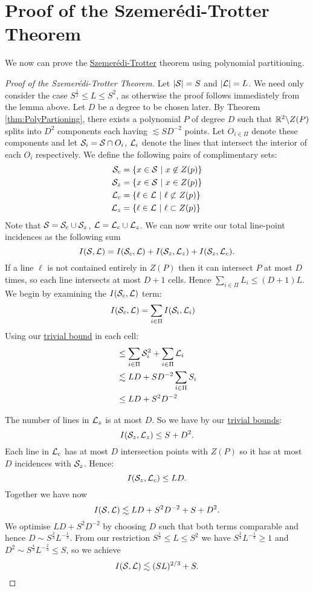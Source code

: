 \section{Proof of the Szemerédi-Trotter Theorem}
We now can prove the \hyperref[thm:S-T]{Szemerédi-Trotter} theorem using polynomial partitioning.
\begin{proof}[Proof of the Szemerédi-Trotter Theorem]
Let $|\mathcal S| = S$ and $|\mathcal L| = L$.
We need only consider the case $S^{\frac{1}{2}} \leq L \leq S^2$, as otherwise the proof follows immediately from the lemma above. 
Let $D$ be a degree to be chosen later. By Theorem \ref{thm:PolyPartioning}, there
exists a polynomial $P$ of degree $D$ such that $\mathbb R^2 \backslash Z(P)$ splits into $D^2$ components each having $\lesssim SD^{-2}$ points. 
Let $O_{i \in \Pi}$ denote these components and let $\mathcal S_i = \mathcal S \cap O_i$, $\mathcal L_i$ denote the lines that intersect the interior of each $O_i$ respectively.
We define the following pairs of complimentary sets:
\begin{align*}
    \mathcal S_c &=\{x \in \mathcal S \ |\ x \not \in Z(p)\}\\
    \mathcal S_z &=\{x \in \mathcal S \ |\ x \in Z(p)\}\\
    \mathcal L_c &=\{\ell \in \mathcal L \ |\ \ell \not \subset Z(p)\}\\
    \mathcal L_z &=\{\ell \in \mathcal L \ |\ \ell \subset Z(p)\}
\end{align*} 
Note that $\mathcal S = \mathcal S_c \cup \mathcal S_z$, $\mathcal L = \mathcal L_c \cup \mathcal L_z$. We can now write our total line-point incidences as the following sum
$$I(\mathcal S, \mathcal L) = I(\mathcal S_c, \mathcal L) + I(\mathcal S_z, \mathcal L_z) + I(\mathcal S_z, \mathcal L_c).$$
If a line $\ell$ is not contained entirely in $Z(P)$ then it can intersect $P$ at most $D$ times, 
 so each line intersects at most $D+1$ cells. Hence $\sum_{i \in \Pi} L_i \leq (D+1)L$. We begin by examining the $I(\mathcal S_c, \mathcal L)$ term:
\begin{align*}
I(\mathcal S_c, \mathcal L) &= \sum_{i \in \Pi} I(\mathcal S_i, \mathcal L_i)
\end{align*}
Using our \hyperref[thm:trivial-ST-bounds]{trivial bound} in each cell:
\begin{align*}
&\leq \sum_{i \in \Pi} \mathcal S_i^2 + \sum_{i \in \Pi} \mathcal L_i\\
&\lesssim LD + SD^{-2} \sum_{i \in \Pi} S_i\\ &\leq LD + S^2D^{-2}
\end{align*} 


The number of lines in $\mathcal L_z$ is at most $D$. So we have by our \hyperref[thm:trivial-ST-bounds]{trivial bounds}:
$$I(\mathcal S_z, \mathcal L_z) \leq S + D^2.$$
Each line in $\mathcal L_c$ has at most $D$ intersection points with $Z(P)$ so it has at most $D$ incidences with $\mathcal S_z$. Hence:
 $$I(\mathcal S_z, \mathcal L_c) \leq LD.$$
Together we have now 
$$I(\mathcal S, \mathcal L) \lesssim LD + S^2D^{-2} +S + D^2.$$
We optimise $LD + S^2D^{-2}$ by choosing $D$ such that both terms comparable and hence $D \sim S^{\frac{2}{3}} L^{-\frac{1}{3}}$. 
From our restriction $S^{\frac{1}{2}} \leq L \leq S^2$ we have $S^{\frac{2}{3}} L^{-\frac{1}{3}} \geq 1$
and $D^2 \sim S^{\frac{4}{3}} L^{-\frac{2}{3}} \leq S$, so we achieve
$$I(\mathcal S, \mathcal L) \lesssim (SL)^{2/3} + S. $$


\end{proof}
